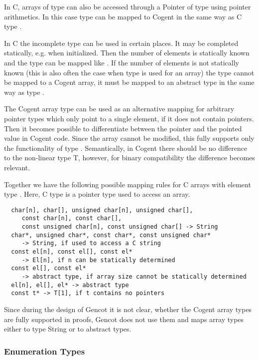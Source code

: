 In C, arrays of type  can also be accessed through a Pointer of type  using pointer
arithmetics. In this case type  can be mapped to Cogent in the same way as C type .

In C the incomplete type  can be used in certain places. It may be completed statically, e.g. 
when initialized. Then the number of elements is statically known and the type can be mapped like .
If the number of elements is not statically known (this is also often the case when type  
is used for an array) the type cannot be mapped to a Cogent array, it must be mapped to an abstract type in
the same way as type .

The Cogent array type  can be used as an alternative mapping for arbitrary pointer types which 
only point to a single element, if it does not contain pointers. Then it becomes possible to differentiate 
between the pointer and the pointed value in Cogent code. Since the array cannot be modified, this fully 
supports only the functionality of type . Semantically, in Cogent there should be no difference 
to the non-linear type T, however, for binary compatibility the difference becomes relevant.

Together we have the following possible mapping rules for C arrays with element type . Here, 
C type  is a pointer type used to access an array.
\begin{verbatim}
  char[n], char[], unsigned char[n], unsigned char[], 
     const char[n], const char[],
     const unsigned char[n], const unsigned char[] -> String
  char*, unsigned char*, const char*, const unsigned char* 
     -> String, if used to access a C string
  const el[n], const el[], const el* 
     -> El[n], if n can be statically determined
  const el[], const el* 
     -> abstract type, if array size cannot be statically determined
  el[n], el[], el* -> abstract type
  const t* -> T[1], if t contains no pointers
\end{verbatim}

Since during the design of Gencot it is not clear, whether the Cogent array types are fully supported in
proofs, Gencot does not use them and maps array types either to type String or to abstract types.

\subsubsection{Enumeration Types}
\label{design-types-enum}

